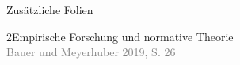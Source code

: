 \documentclass[xcolor=table,9pt,aspectratio=169]{beamer}
\begin{document}
\begin{frame}
\begin{overlayarea}{\textwidth}{0.81\paperheight}
   {
   \vspace*{11mm}
   \textcolor{uolblue}
   {Zusätzliche Folien}
   }
\end{overlayarea}
\end{frame}


\begin{frame}{\vspace*{10mm}2\hspace*{1em}Empirische Forschung und normative Theorie}
\\
\footnotesize{\textcolor{gray}{Bauer und Meyerhuber 2019, S. 26}}
\end{frame}
\end{document}
